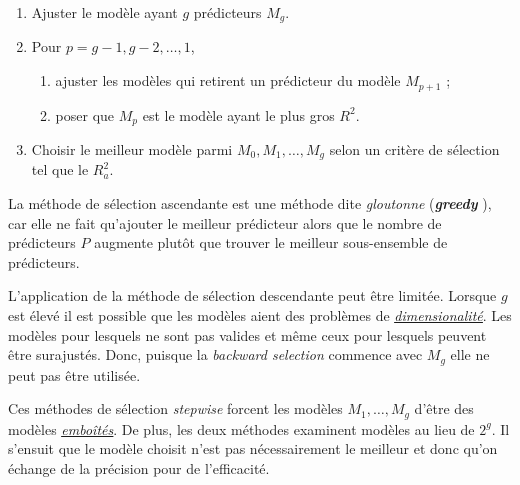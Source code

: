 \documentclass[french]{article}
\begin{document}
\begin{multicols*}{2}
\begin{algo2}
\begin{enumerate}[label = \circled{\arabic*}{trueblue}]
	\item	Ajuster le modèle ayant $g$ prédicteurs $M_{g}$.
	\item	Pour $p = g - 1, g - 2, \dots, 1$, 
		\begin{enumerate}[label = \circled{\scriptsize{(\alph*)}}{trueblue!80!white}]
			\item	ajuster les modèles qui retirent un prédicteur du modèle $M_{p + 1}$ ;
			\item	poser que $M_{p}$ est le modèle ayant le plus gros $R^{2}$.
		\end{enumerate}
	\item	Choisir le meilleur modèle parmi $M_{0}, M_{1}, \dots, M_{g}$ selon un critère de sélection tel que le $R^{2}_{a}$.
\end{enumerate}
\end{algo2}

\begin{rappel_enhanced}[Limitations]
La méthode de sélection ascendante est une méthode dite \textit{gloutonne} (\og \textit{\textbf{greedy}} \fg{}), car elle ne fait qu'ajouter le meilleur prédicteur alors que le nombre de prédicteurs $P$ augmente plutôt que trouver le meilleur sous-ensemble de prédicteurs.

\bigskip

L'application de la méthode de sélection descendante peut être limitée. Lorsque $g$ est élevé il est possible que les modèles aient des problèmes de \textit{\color{bleudefrance}\underline{\hyperlink{multidimProb}{\color{bleudefrance} dimensionalité}}}. Les modèles pour lesquels  ne sont pas valides et même ceux pour lesquels  peuvent être surajustés. Donc, puisque la \og \textit{backward selection} \fg{} commence avec $M_{g}$ elle ne peut pas être utilisée. 

\bigskip

Ces méthodes de sélection \og \textit{stepwise} \fg{} forcent les modèles $M_{1}, \dots, M_{g}$ d'être des modèles \textit{\color{bleudefrance}\underline{\hyperlink{nestedModels}{\color{bleudefrance} emboîtés}}}. De plus, les deux méthodes examinent  modèles au lieu de $2^{g}$. Il s'ensuit que le modèle choisit n'est pas nécessairement le meilleur et donc qu'on échange de la précision pour de l'efficacité.
\end{rappel_enhanced}



\end{multicols*}
\end{document}
